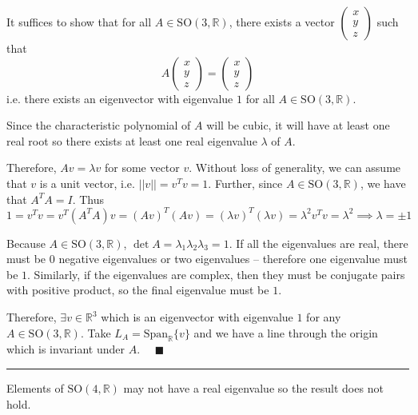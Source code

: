\documentclass[12pt]{article}
\newcommand{\R}{\mathbb{R}}
\newcommand{\SO}{\text{SO}}
\newcommand{\norm}[1]{\left\vert \left\vert #1 \right\vert \right\vert}
\newcommand{\qed}{\quad \blacksquare}
\begin{document}
    \color{blue}
        It suffices to show that for all $A \in \SO(3, \R)$, there exists a vector $\begin{pmatrix}
            x\\
            y\\
            z
        \end{pmatrix}$ such that 
        \[A\begin{pmatrix}
            x\\
            y\\
            z
        \end{pmatrix} = \begin{pmatrix}
            x\\
            y\\
            z
        \end{pmatrix}\]
        i.e. there exists an eigenvector with eigenvalue $1$ for all $A \in \SO(3, \R)$. 

        Since the characteristic polynomial of $A$ will be cubic, it will have at least one real root so there exists at least one real eigenvalue $\lambda$ of $A$.

        Therefore, $Av = \lambda v$ for some vector $v$. Without loss of generality, we can assume that $v$ is a unit vector, i.e. $\norm v = v^Tv = 1$. Further, since $A \in \SO(3, \R)$, we have that $A^T A = I$. Thus 
        \[1 = v^Tv = v^T(A^TA)v = (Av)^T(Av) = (\lambda v)^T(\lambda v) = \lambda^2 v^Tv = \lambda^2 \implies \lambda = \pm 1\]

        Because $A \in \SO(3, \R)$, $\det A = \lambda_1 \lambda_2 \lambda_3 = 1$. If all the eigenvalues are real, there must be 0 negative eigenvalues or two eigenvalues -- therefore one eigenvalue must be $1$. Similarly, if the eigenvalues are complex, then they must be conjugate pairs with positive product, so the final eigenvalue must be $1$.

        Therefore, $\exists v\in \R^3$ which is an eigenvector with eigenvalue $1$ for any $A \in \SO(3, \R)$. Take $L_A = \text{Span}_{\R}\{v\}$ and we have a line through the origin which is invariant under $A$. $\qed$

        \vspace*{10pt}
        \hrule 
        \vspace*{10pt}

        Elements of $\SO(4, \R)$ may not have a real eigenvalue so the result does not hold. 
    \color{black}

\pagebreak
\end{document}

